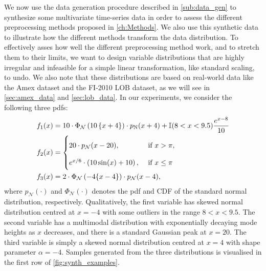 \documentclass{statsmsc}
\begin{document}
{We now use the data generation procedure described in \cref{sub:data_gen} to synthesize some
multivariate time-series data in order to assess the different preprocessing methods proposed
in \cref{ch:Methods}. We also use this synthetic data to illustrate how the different methods
transform the data distribution.
To effectively asses how well the different preprocessing method work, and
to stretch them to their limits, we want to design variable distributions that are
highly irregular and infeasible for a simple linear transformation, like
standard scaling, to undo. We also note that these distributions are based on real-world
data like the Amex dataset and the FI-2010 LOB dataset, as we will see in
\cref{sec:amex_data} and \cref{sec:lob_data}.
In our experiments, we consider the following three \acp{pdf}:
\begin{align}
    f_1(x)&= 10 \cdot\Phi_{\mathcal{N}}\left(10\left\{x+4\right\}\right)\cdot p_{\textrm{N}}(x+4)
    +  \mathbb{I}(8 < x < 9.5) \frac{e^{x-8}}{10} \label{eq:synth_pdf1}\\
    f_2(x)&= \left\{
        \renewcommand\arraystretch{2}
        \begin{matrix*}[l]
            20 \cdot p_{\mathcal{N}}(x-20), & \textrm{ if } x > \pi, \\
            e^{x/6}\cdot\left(10\sin(x)+10 \right), & \textrm{ if } x \leq \pi
        \end{matrix*}
    \right. \label{eq:synth_pdf2}\\
        f_3(x)&=
        2 \cdot \Phi_{\mathcal{N}}\left(-4 \{ x-4\}\right) \cdot p_{\mathcal{N}}(x-4), \label{eq:synth_pdf3}
\end{align}
where $p_{\mathcal{N}}(\cdot)$ and $\Phi_{\mathcal{N}}(\cdot)$ denotes the \ac{pdf}
and \ac{CDF} of the standard normal distribution, respectively.
Qualitatively, the first variable has skewed normal distribution centred at $x=-4$ with some
outliers in the range $8 < x < 9.5$. The second variable has a multimodal distribution with
exponentially decaying mode heights as $x$ decreases, and there is a standard Gaussian peak
at $x=20$. The third variable is simply a skewed normal distribution centred at
$x=4$ with shape parameter $\alpha=-4$. Samples generated from the three distributions is
visualised in the first row of \cref{fig:synth_examples}.

}
\end{document}
